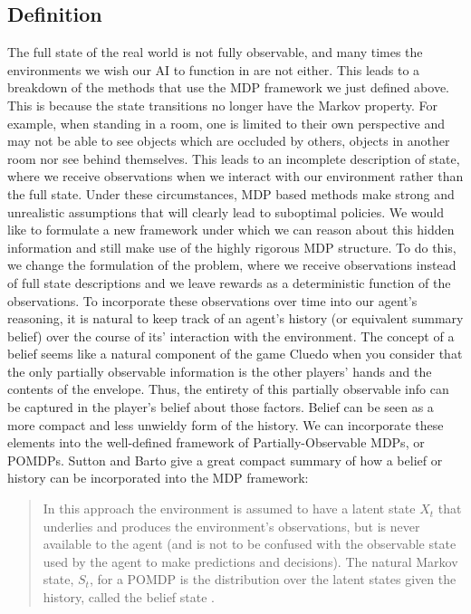 \documentclass[msc, deptreport, ai, romanprepages]{infthesis}
\begin{document}
\subsection{Definition}
The full state of the real world is not fully observable, and many times the environments we wish our AI to function in are not either. This leads to a breakdown of the methods that use the MDP framework we just defined above. This is because the state transitions no longer have the Markov property. For example, when standing in a room, one is limited to their own perspective and may not be able to see objects which are occluded by others, objects in another room nor see behind themselves. This leads to an incomplete description of state, where we receive observations when we interact with our environment rather than the full state. Under these circumstances, MDP based methods make strong and unrealistic assumptions that will clearly lead to suboptimal policies. We would like to formulate a new framework under which we can reason about this hidden information and still make use of the highly rigorous MDP structure. To do this, we change the formulation of the problem, where we receive observations instead of full state descriptions and we leave rewards as a deterministic function of the observations. To incorporate these observations over time into our agent’s reasoning, it is natural to keep track of an agent’s history (or equivalent summary belief) over the course of its’ interaction with the environment. The concept of a belief seems like a natural component of the game Cluedo when you consider that the only partially observable information is the other players’ hands and the contents of the envelope. Thus, the entirety of this partially observable info can be captured in the player’s belief about those factors. Belief can be seen as a more compact and less unwieldy form of the history. We can incorporate these elements into the well-defined framework of Partially-Observable MDPs, or POMDPs. Sutton and Barto give a great compact summary of how a belief or history can be incorporated into the MDP framework:
\begin{quote}
In this approach the environment is assumed to have a latent state \(X_t\) that underlies and produces the environment’s observations, but is never available to the agent (and is not to be confused with the observable state used by the agent to make predictions and decisions). The natural Markov state, \(S_t\), for a POMDP is the distribution over the latent states given the history, called the belief state \cite{Sutton-barto}.
\end{quote}
\end{document}
